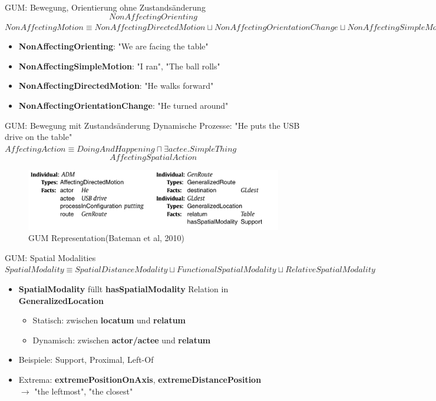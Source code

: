 \documentclass[12pt,a4paper]{beamer}
\begin{document}
\begin{frame}{GUM: Bewegung, Orientierung ohne Zustandsänderung}
$$ NonAffectingOrienting  $$
$ NonAffectingMotion \equiv NonAffectingDirectedMotion
\sqcup NonAffectingOrientationChange 
\sqcup NonAffectingSimpleMotion$
\begin{itemize}
\item \textbf{NonAffectingOrienting}: "We are facing the table"
\item \textbf{NonAffectingSimpleMotion}:  "I ran", "The ball rolls"
\item \textbf{NonAffectingDirectedMotion}: "He walks forward"
\item \textbf{NonAffectingOrientationChange}: "He turned around"
\end{itemize}
\end{frame}


\begin{frame}{GUM: Bewegung mit Zustandsänderung}
Dynamische Prozesse: "He puts the USB drive on the table"
$AffectingAction \equiv DoingAndHappening \sqcap \exists actee.SimpleThing$
$$AffectingSpatialAction$$
\begin{figure}
\includegraphics[scale=0.7]{img/2010_puts_usb_on_table.png}
\caption{GUM Representation(Bateman et al, 2010)}
\end{figure}
\end{frame}

\begin{frame}{GUM: Spatial Modalities}
$  SpatialModality \equiv SpatialDistanceModality \sqcup FunctionalSpatialModality \sqcup RelativeSpatialModality $
\begin{itemize}
\item \textbf{SpatialModality} füllt \textbf{hasSpatialModality} Relation in \textbf{GeneralizedLocation}
\begin{itemize}
    \item Statisch: zwischen \textbf{locatum} und \textbf{relatum}
    \item Dynamisch: zwischen \textbf{actor/actee} und \textbf{relatum}
\end{itemize}
\item Beispiele: Support, Proximal, Left-Of
\item Extrema: \textbf{extremePositionOnAxis}, \textbf{extremeDistancePosition} \\
$\to$ "the leftmost", "the closest"
\end{itemize}
\end{frame}
\end{document}
